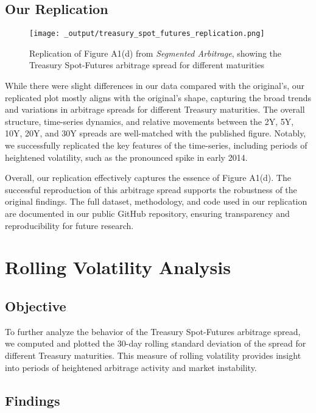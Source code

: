 \documentclass{article}
\begin{document}
\subsection{Our Replication}

\begin{figure}[h]
  \centering
  \texttt{[image: \_output/treasury\_spot\_futures\_replication.png]}
  \caption{Replication of Figure A1(d) from \textit{Segmented Arbitrage}, showing the Treasury Spot-Futures arbitrage spread for different maturities}
  \label{fig:treasury_spot_futures_replication}
\end{figure}




While there were slight differences in our data compared with the original's, our replicated plot mostly aligns with the original's shape, capturing the broad trends and variations in arbitrage spreads for different Treasury maturities. The overall structure, time-series dynamics, and relative movements between the 2Y, 5Y, 10Y, 20Y, and 30Y spreads are well-matched with the published figure. Notably, we successfully replicated the key features of the time-series, including periods of heightened volatility, such as the pronounced spike in early 2014.

Overall, our replication effectively captures the essence of Figure A1(d). The successful reproduction of this arbitrage spread supports the robustness of the original findings. The full dataset, methodology, and code used in our replication are documented in our public GitHub repository, ensuring transparency and reproducibility for future research.


\newpage


\section{Rolling Volatility Analysis}
\subsection{Objective}

To further analyze the behavior of the Treasury Spot-Futures arbitrage spread, we computed and plotted the 30-day rolling standard deviation of the spread for different Treasury maturities. This measure of rolling volatility provides insight into periods of heightened arbitrage activity and market instability.

\subsection{Findings}
\end{document}
